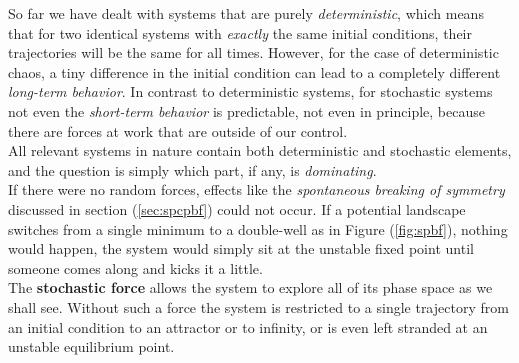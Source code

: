 So far we have dealt with systems that are purely \emph{deterministic}, which means that for two identical systems with \emph{exactly} the same initial conditions, their trajectories will be the same for all times.
However, for the case of deterministic chaos, a tiny difference in the initial condition can lead to a completely different \emph{long-term behavior}. In contrast to deterministic systems, for stochastic systems not even the \emph{short-term behavior} is predictable, not even in principle, because there are forces at work that are outside of our control.\\
All relevant systems in nature contain both deterministic and stochastic elements, and the question is simply which part, if any, is \emph{dominating}.\\
If there were no random forces, effects like the \emph{spontaneous breaking of symmetry} discussed in section (\ref{sec:spcpbf}) could not occur.
If a potential landscape switches from a single minimum to a double-well as in Figure (\ref{fig:spbf}), nothing would happen, the system would simply sit at the unstable fixed point until someone comes along and kicks it a little.\\
The \textbf{stochastic force} allows the system to explore all of its phase space as we shall see.
Without such a force the system is restricted to a single trajectory from an initial condition to an attractor or to infinity, or is even left stranded at an unstable equilibrium point.